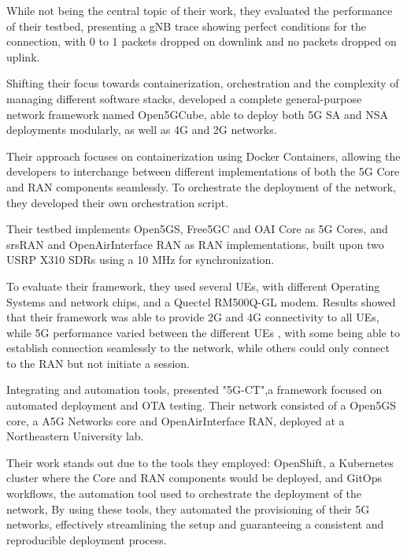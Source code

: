 While not being the central topic of their work, they evaluated the performance of their testbed, presenting a \gls{gNB} trace showing perfect conditions for the connection, with 0 to 1 packets dropped on downlink and no packets dropped on uplink.\bigskip

Shifting their focus towards containerization, orchestration and the complexity of managing different software stacks, \textcite{horstmann2025open5gcube} developed a complete general-purpose network framework named Open5GCube, able to deploy both 5G \gls{SA} and \gls{NSA} deployments modularly, as well as 4G  and 2G  networks.

Their approach focuses on containerization using Docker Containers, allowing the developers to interchange between different implementations of both the 5G Core and \gls{RAN} components seamlessly. To orchestrate the deployment of the network, they developed their own orchestration script.

Their testbed implements Open5GS, Free5GC and OAI Core as 5G Cores, and srsRAN and OpenAirInterface RAN as \gls{RAN} implementations, built upon two USRP X310 \glspl{SDR} using a 10 MHz  for synchronization.

To evaluate their framework, they used several  \glspl{UE}, with different Operating Systems and network chips, and a Quectel RM500Q-GL modem. Results showed that their framework was able to provide 2G and 4G connectivity to all \glspl{UE}, while 5G performance varied between the different \glspl{UE} , with some being able to establish connection seamlessly to the network, while others could only connect to the RAN but not initiate a  session. \bigskip


Integrating  and automation tools, \textcite{bonati2025_5gct} presented "5G-CT",a framework focused on automated deployment and \gls{OTA} testing. Their network consisted of a Open5GS core, a A5G Networks core and OpenAirInterface \gls{RAN}, deployed at a Northeastern University lab.

Their work stands out due to the tools they employed: OpenShift, a Kubernetes cluster where the Core and \gls{RAN} components would be deployed, and GitOps workflows, the automation tool used to orchestrate the deployment of the network, By using these tools, they automated the provisioning of their 5G networks, effectively streamlining the setup and guaranteeing a consistent and reproducible deployment process.

